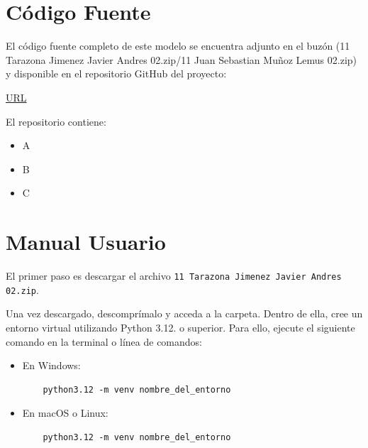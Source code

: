 \documentclass{article}
\begin{document}

\section{Código Fuente}\label{sec:cod}

El código fuente completo de este modelo se encuentra adjunto en el buzón 
(11 Tarazona Jimenez Javier Andres 02.zip/11 Juan Sebastian Muñoz Lemus 02.zip)
y disponible en el repositorio GitHub del proyecto:

\begin{center}
\url{URL}
\end{center}

El repositorio contiene:
\begin{itemize}
\item A
\item B
\item C
\end{itemize}


\section{Manual Usuario}\label{sec:man_u}

El primer paso es descargar el archivo \texttt{11 Tarazona Jimenez Javier Andres 02.zip}.

Una vez descargado, descomprímalo y acceda a la carpeta. Dentro de ella, cree un 
entorno virtual utilizando Python 3.12. o superior. Para ello, ejecute el siguiente 
comando en 
la terminal o línea de comandos:

\begin{itemize}
  \item En Windows:
  \begin{verbatim}
    python3.12 -m venv nombre_del_entorno
  \end{verbatim}
  \item En macOS o Linux:
  \begin{verbatim}
    python3.12 -m venv nombre_del_entorno
  \end{verbatim}
\end{itemize}
\end{document}
